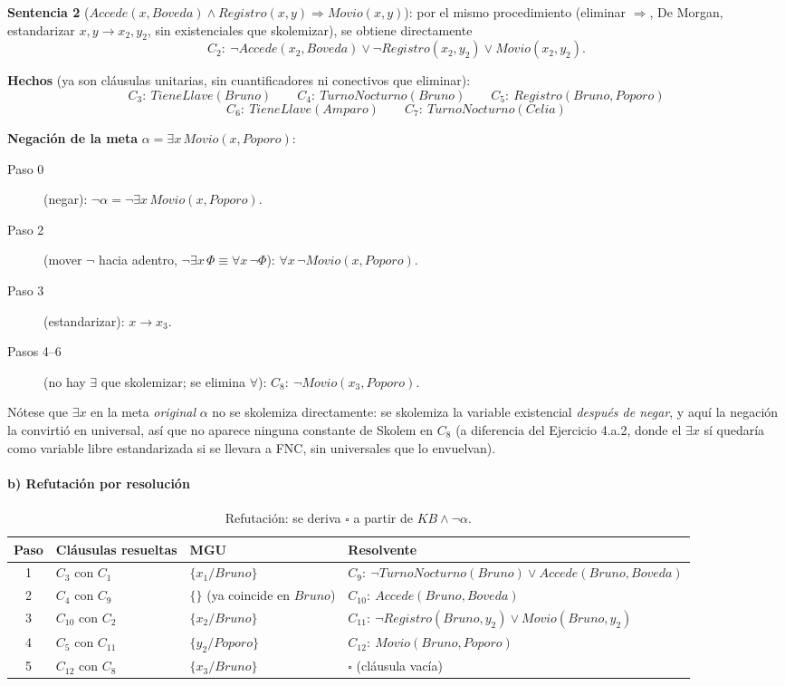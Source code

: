 \textbf{Sentencia 2} ($Accede(x,Boveda)\land Registro(x,y) \Rightarrow Movio(x,y)$): por el mismo
procedimiento (eliminar $\Rightarrow$, De Morgan, estandarizar $x,y\to x_2,y_2$, sin existenciales
que skolemizar), se obtiene directamente
\[
    C_2:\ \neg Accede(x_2,Boveda) \lor \neg Registro(x_2,y_2) \lor Movio(x_2,y_2).
\]

\textbf{Hechos} (ya son cláusulas unitarias, sin cuantificadores ni conectivos que eliminar):
\[
    C_3:\ TieneLlave(Bruno) \qquad C_4:\ TurnoNocturno(Bruno) \qquad C_5:\ Registro(Bruno,Poporo)
\]
\[
    C_6:\ TieneLlave(Amparo) \qquad C_7:\ TurnoNocturno(Celia)
\]

\textbf{Negación de la meta} $\alpha = \exists x\, Movio(x,Poporo)$:
\begin{description}
    \item[Paso 0] (negar): $\neg\alpha = \neg\exists x\, Movio(x,Poporo)$.
    \item[Paso 2] (mover $\neg$ hacia adentro, $\neg\exists x\,\Phi\equiv\forall x\,\neg\Phi$):
    $\forall x\, \neg Movio(x,Poporo)$.
    \item[Paso 3] (estandarizar): $x\to x_3$.
    \item[Pasos 4--6] (no hay $\exists$ que skolemizar; se elimina $\forall$): $C_8:\
    \neg Movio(x_3,Poporo)$.
\end{description}
Nótese que $\exists x$ en la meta \emph{original} $\alpha$ no se skolemiza directamente: se skolemiza
la variable existencial \emph{después de negar}, y aquí la negación la convirtió en universal, así
que no aparece ninguna constante de Skolem en $C_8$ (a diferencia del Ejercicio 4.a.2, donde el
$\exists x$ sí quedaría como variable libre estandarizada si se llevara a FNC, sin universales que lo
envuelvan).

\paragraph{b) Refutación por resolución}

\begin{table}[H]
\centering
\small
\begin{tabular}{@{}c p{2.6cm} p{2.2cm} p{6.4cm}@{}}
\toprule
Paso & Cláusulas resueltas & MGU & Resolvente \\
\midrule
1 & $C_3$ con $C_1$ & $\{x_1/Bruno\}$ & $C_9:\ \neg TurnoNocturno(Bruno)\lor
Accede(Bruno,Boveda)$\\[4pt]
2 & $C_4$ con $C_9$ & $\{\}$ (ya coincide en $Bruno$) & $C_{10}:\ Accede(Bruno,Boveda)$\\[4pt]
3 & $C_{10}$ con $C_2$ & $\{x_2/Bruno\}$ & $C_{11}:\ \neg Registro(Bruno,y_2)\lor
Movio(Bruno,y_2)$\\[4pt]
4 & $C_5$ con $C_{11}$ & $\{y_2/Poporo\}$ & $C_{12}:\ Movio(Bruno,Poporo)$\\[4pt]
5 & $C_{12}$ con $C_8$ & $\{x_3/Bruno\}$ & $\square$ (cláusula vacía)\\
\bottomrule
\end{tabular}
\caption{Refutación: se deriva $\square$ a partir de $KB \land \neg\alpha$.}
\end{table}

